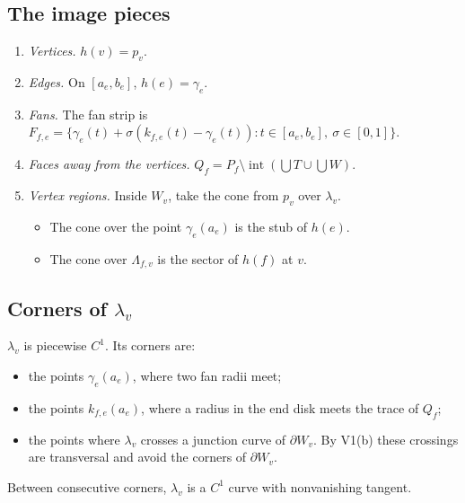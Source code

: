 \documentclass[preprint,12pt]{elsarticle}
\theoremstyle{definition}
\theoremstyle{remark}
\newcommand{\inter}{\operatorname{int}}
\begin{document}
\subsection{The image pieces}
\begin{enumerate}
\item \emph{Vertices.} $h(v)=p_v$.
\item \emph{Edges.} On $[a_e,b_e]$, $h(e)=\gamma_e$.
\item \emph{Fans.} The fan strip is $F_{f,e}=\{\gamma_e(t)+\sigma(k_{f,e}(t)-\gamma_e(t)):t\in[a_e,b_e],\ \sigma\in[0,1]\}$.
\item \emph{Faces away from the vertices.} $Q_f=P_f\setminus\inter(\bigcup T\cup\bigcup W)$.
\item \emph{Vertex regions.} Inside $W_v$, take the cone from $p_v$ over $\lambda_v$.
  \begin{itemize}
  \item The cone over the point $\gamma_e(a_e)$ is the stub of $h(e)$.
  \item The cone over $\Lambda_{f,v}$ is the sector of $h(f)$ at $v$.
  \end{itemize}
\end{enumerate}

\subsection{Corners of $\lambda_v$}
$\lambda_v$ is piecewise $C^1$. Its corners are:
\begin{itemize}
\item the points $\gamma_e(a_e)$, where two fan radii meet;
\item the points $k_{f,e}(a_e)$, where a radius in the end disk meets the trace of $Q_f$;
\item the points where $\lambda_v$ crosses a junction curve of $\partial W_v$. By V1(b) these crossings are
transversal and avoid the corners of $\partial W_v$.
\end{itemize}
Between consecutive corners, $\lambda_v$ is a $C^1$ curve with nonvanishing tangent.
\end{document}
